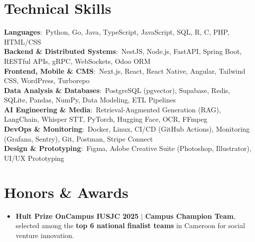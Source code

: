 \documentclass[letterpaper,10pt]{article}
\newcommand{\resumeItem}[1]{
  \item\small{
    {#1 \vspace{-1.5pt}}
  }
}
\begin{document}
\section{Technical Skills}
\begin{itemize}[leftmargin=0.15in, label={}]
    \small{\item{
     \textbf{Languages}{:\ Python, Go, Java, TypeScript, JavaScript, SQL, R, C, PHP, HTML/CSS} \\ \vspace{1.5pt}
     \textbf{Backend \& Distributed Systems}{:\ NestJS, Node.js, FastAPI, Spring Boot, RESTful APIs, gRPC, WebSockets, Odoo ORM} \\ \vspace{1.5pt}
     \textbf{Frontend, Mobile \& CMS}{:\ Next.js, React, React Native, Angular, Tailwind CSS, WordPress, Turborepo} \\ \vspace{1.5pt}
     \textbf{Data Analysis \& Databases}{:\ PostgreSQL (pgvector), Supabase, Redis, SQLite, Pandas, NumPy, Data Modeling, ETL Pipelines} \\ \vspace{1.5pt}
     \textbf{AI Engineering \& Media}{:\ Retrieval-Augmented Generation (RAG), LangChain, Whisper STT, PyTorch, Hugging Face, OCR, FFmpeg} \\ \vspace{1.5pt}
     \textbf{DevOps \& Monitoring}{:\ Docker, Linux, CI/CD (GitHub Actions), Monitoring (Grafana, Sentry), Git, Postman, Stripe Connect} \\ \vspace{1.5pt}
     \textbf{Design \& Prototyping}{:\ Figma, Adobe Creative Suite (Photoshop, Illustrator), UI/UX Prototyping}
    }}
\end{itemize}

\section{Honors \& Awards}
\begin{itemize}[leftmargin=0.15in, label={$\vcenter{\hbox{\tiny$\bullet$}}$}, itemsep=1pt]
    \resumeItem{\textbf{Hult Prize OnCampus IUSJC 2025} $|$ \textbf{Campus Champion Team}, selected among the \textbf{top 6 national finalist teams} in Cameroon for social venture innovation.}
\end{itemize}

\end{document}
